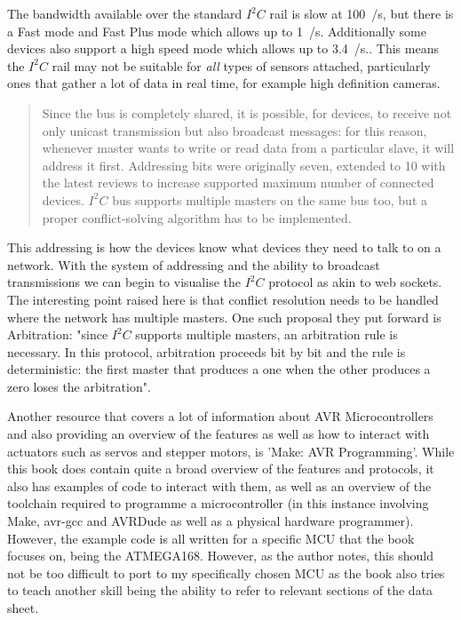 \documentclass[11pt,a4paper,titlepage]{report}
\begin{document}
	The bandwidth available over the standard $I^{2}C$ rail is slow at 100\unit{\kilo\bit}/\unit{\second}, but there is a Fast mode and Fast Plus mode which allows up to 1\unit{\mega\bit}/\unit{\second}. Additionally some devices also support a high speed mode which allows up to 3.4\unit{\mega\bit}/\unit{\second}.\cite{I2C_FAST}. This means the $I^{2}C$ rail may not be suitable for \textit{all} types of sensors attached, particularly ones that gather a lot of data in real time, for example high definition cameras. 
	
	\begin{quote}
		Since the bus is completely shared, it is possible, for devices, to receive not only unicast transmission but also broadcast messages: for this reason, whenever master wants to write or read data from a particular slave, it will address it first. Addressing bits were originally seven, extended to 10 with the latest reviews to increase supported maximum number of connected devices. $I^{2}C$ bus supports multiple masters on the same bus too, but a proper conflict-solving algorithm has to be implemented. \cite{I2C}
	\end{quote}
	
	This addressing is how the devices know what devices they need to talk to on a network. With the system of addressing and the ability to broadcast transmissions we can begin to visualise the $I^{2}C$ protocol as akin to web sockets. The interesting point raised here is that conflict resolution needs to be handled where the network has multiple masters. One such proposal they put forward is Arbitration: "since $I^{2}C$ supports multiple masters, an arbitration rule is necessary. In this protocol, arbitration proceeds bit by bit and the rule is deterministic: the first master that produces a one when the other produces a zero loses the arbitration"\cite{I2C}. 
	
	Another resource that covers a lot of information about AVR Microcontrollers and also providing an overview of the features as well as how to interact with actuators such as servos and stepper motors, is 'Make: AVR Programming'\cite{MAKE_AVR}. While this book does contain quite a broad overview of the features and protocols, it also has examples of code to interact with them, as well as an overview of the toolchain required to programme a microcontroller (in this instance involving Make, avr-gcc\cite{GCC_AVR} and AVRDude\cite{AVRDUDE} as well as a physical hardware programmer). However, the example code is all written for a specific MCU that the book focuses on, being the ATMEGA168. However, as the author notes, this should not be too difficult to port to my specifically chosen MCU as the book also tries to teach another skill being the ability to refer to relevant sections of the data sheet. 
	
\end{document}
